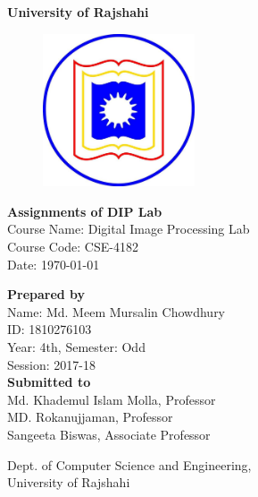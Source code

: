 \documentclass{article}
\begin{document}


\begin{titlepage}
    \begin{center}
        \textbf {\Huge {University of Rajshahi}} \\
        \hfill \break
    \end{center} 
    \begin{figure}[h]
        \centering
        \includegraphics[width=0.4\textwidth]{ru.jpg}
    \end{figure}
    \begin{center}
        \hfill \break
        \hfill \break
        \textbf{\Huge {Assignments of DIP Lab}} \\
        \hfill \break
        \LARGE {Course Name: Digital Image Processing Lab} \\
        \LARGE {Course Code: CSE-4182} \\
        \Large {Date: \today} \\
        \hfill \break
        \hfill \break
        \begin{multicols}{2}
        \raggedright
        \Large {\textbf{Prepared by}} \\
        \large {Name: Md. Meem Mursalin Chowdhury} \\ 
        \large {ID: 1810276103} \\
        \large {Year: 4th, Semester: Odd} \\
        \large {Session: 2017-18} \\
        \LARGE {\textbf{Submitted to}} \\
        \large {Md. Khademul Islam Molla, Professor} \\
        \large {MD. Rokanujjaman, Professor} \\
        \large {Sangeeta Biswas, Associate Professor}
        \hfill \break
        \end{multicols}
        \hfill \break
        \hfill \break
        \LARGE {Dept. of Computer Science and Engineering,\\ University of Rajshahi} \\
    \end{center}
\end{titlepage}
\end{document}
